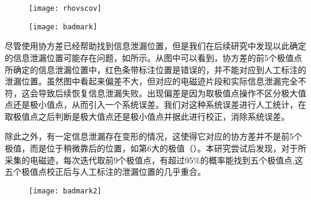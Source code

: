 {	\begin{figure}[!h]
		\begin{center}
			\texttt{[image: rhovscov]}
			\label{fig:rhovscov}
		\end{center}
	\end{figure}

	\begin{figure}[!h]
		\begin{center}
			\texttt{[image: badmark]}
			\label{fig:badmark}
		\end{center}
	\end{figure}
	
	尽管使用协方差已经帮助找到信息泄漏位置，但是我们在后续研究中发现以此确定的信息泄漏位置可能存在问题，如所示。从图中可以看到，协方差的前5个极值点所确定的信息泄漏位置中，红色条带标注位置是错误的，并不能对应到人工标注的泄漏位置。虽然图中看起来偏差不大，但对应的电磁迹片段和实际信息泄漏完全不符，这会导致后续恢复信息泄漏失败。出现偏差是因为取极值点操作不区分极大值点还是极小值点，从而引入一个系统误差。我们对这种系统误差进行人工统计，在取极值点之后判断是极大值点还是极小值点并据此进行校正，消除系统误差。
	
	除此之外，有一定信息泄漏存在变形的情况，这使得它对应的协方差并不是前5个极值，而是位于稍微靠后的位置，如第6大的极值（）。本研究尝试后发现，对于所采集的电磁迹，每次迭代取前9个极值点，有超过95\%的概率能找到五个极值点,这五个极值点校正后与人工标注的泄漏位置的几乎重合。
	
	\begin{figure}[!h]
		\begin{center}
			\texttt{[image: badmark2]}
			\label{fig:badmark2}
		\end{center}
	\end{figure}

}
